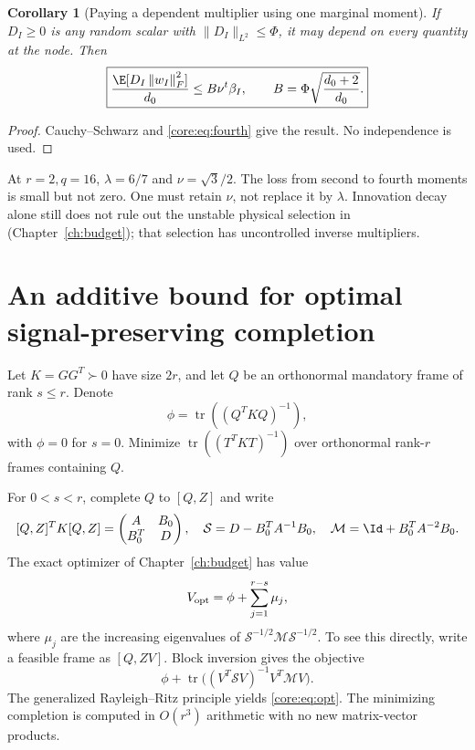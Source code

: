 \documentclass[11pt,oneside,openany,a4paper]{book}
\numberwithin{equation}{chapter}
\newtheorem{corollary}[theorem]{Corollary}
\theoremstyle{definition}
\theoremstyle{remark}
\newcommand{\F}[1]{\left\lVert#1\right\rVert_F}
\DeclareMathOperator{\tr}{tr}\DeclareMathOperator{\rank}{rank}
\begin{document}
\begin{corollary}[Paying a dependent multiplier using one marginal moment]\label{core:cor:holder}
If $D_I\ge0$ is any random scalar with $\|D_I\|_{L^2}\le\Phi$, it may depend on every quantity at the node. Then
\begin{equation}\label{core:eq:holder}
 \boxed{\frac{\E[D_I\F{w_I}^2]}{d_0}
 \le B\nu^t\beta_I,\qquad
 B=\Phi\sqrt{\frac{d_0+2}{d_0}}.}
\end{equation}
\end{corollary}
\begin{proof}
Cauchy--Schwarz and \eqref{core:eq:fourth} give the result. No independence is used.
\end{proof}
At $r=2,q=16$, $\lambda=6/7$ and $\nu=\sqrt3/2$. The loss from second to fourth moments is small but not zero. One must retain $\nu$, not replace it by $\lambda$. Innovation decay alone still does not rule out the unstable physical selection in (Chapter~\ref{ch:budget}); that selection has uncontrolled inverse multipliers.

\section{An additive bound for optimal signal-preserving completion}\label{core:sec:additive}
Let $K=GG^T\succ0$ have size $2r$, and let $Q$ be an orthonormal mandatory frame of rank $s\le r$. Denote
\[
 \phi=\tr((Q^TKQ)^{-1}),
\]
with $\phi=0$ for $s=0$. Minimize $\tr((T^TKT)^{-1})$ over orthonormal rank-$r$ frames containing $Q$.

For $0<s<r$, complete $Q$ to $[Q,Z]$ and write
\[
 [Q,Z]^TK[Q,Z]=\begin{pmatrix}A&B_0\\B_0^T&D\end{pmatrix},\quad
 \mathcal S=D-B_0^TA^{-1}B_0,\quad
 \mathcal M=\Id+B_0^TA^{-2}B_0.
\]
The exact optimizer of Chapter~\ref{ch:budget} has value
\begin{equation}\label{core:eq:opt}
 V_{\rm opt}=\phi+\sum_{j=1}^{r-s}\mu_j,
\end{equation}
where $\mu_j$ are the increasing eigenvalues of $\mathcal S^{-1/2}\mathcal M\mathcal S^{-1/2}$. To see this directly, write a feasible frame as $[Q,ZV]$. Block inversion gives the objective
\[
 \phi+\tr\bigl((V^T\mathcal SV)^{-1}V^T\mathcal MV\bigr).
\]
The generalized Rayleigh--Ritz principle yields \eqref{core:eq:opt}. The minimizing completion is computed in $O(r^3)$ arithmetic with no new matrix-vector products.
\end{document}
